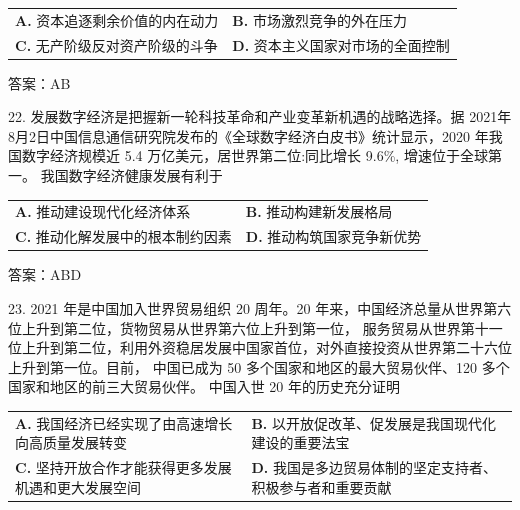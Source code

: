 \documentclass[UTF8,11pt]{ctexart}
\begin{document}
\begin{center}\begin{tabular}{>{\raggedright\arraybackslash}p{\dimexpr(\linewidth-4\tabcolsep)/2\relax}>{\raggedright\arraybackslash}p{\dimexpr(\linewidth-4\tabcolsep)/2\relax}}
\textbf{A.} 资本追逐剩余价值的内在动力 & \textbf{B.} 市场激烈竞争的外在压力\\[.35em]
\textbf{C.} 无产阶级反对资产阶级的斗争 & \textbf{D.} 资本主义国家对市场的全面控制\\[.35em]\end{tabular}\end{center}

答案：AB


22. 发展数字经济是把握新一轮科技革命和产业变革新机遇的战略选择。据 2021年8月2日中国信息通信研究院发布的《全球数字经济白皮书》统计显示，2020 年我国数字经济规模近 5.4 万亿美元，居世界第二位:同比增长 9.6\%, 增速位于全球第一。 我国数字经济健康发展有利于


\begin{center}\begin{tabular}{>{\raggedright\arraybackslash}p{\dimexpr(\linewidth-4\tabcolsep)/2\relax}>{\raggedright\arraybackslash}p{\dimexpr(\linewidth-4\tabcolsep)/2\relax}}
\textbf{A.} 推动建设现代化经济体系 & \textbf{B.} 推动构建新发展格局\\[.35em]
\textbf{C.} 推动化解发展中的根本制约因素 & \textbf{D.} 推动构筑国家竞争新优势\\[.35em]\end{tabular}\end{center}

答案：ABD


23. 2021 年是中国加入世界贸易组织 20 周年。20 年来，中国经济总量从世界第六位上升到第二位，货物贸易从世界第六位上升到第一位， 服务贸易从世界第十一位上升到第二位，利用外资稳居发展中国家首位，对外直接投资从世界第二十六位上升到第一位。目前， 中国已成为 50 多个国家和地区的最大贸易伙伴、120 多个国家和地区的前三大贸易伙伴。 中国入世 20 年的历史充分证明


\begin{center}\begin{tabular}{>{\raggedright\arraybackslash}p{\dimexpr(\linewidth-4\tabcolsep)/2\relax}>{\raggedright\arraybackslash}p{\dimexpr(\linewidth-4\tabcolsep)/2\relax}}
\textbf{A.} 我国经济已经实现了由高速增长向高质量发展转变 & \textbf{B.} 以开放促改革、促发展是我国现代化建设的重要法宝\\[.35em]
\textbf{C.} 坚持开放合作才能获得更多发展机遇和更大发展空间 & \textbf{D.} 我国是多边贸易体制的坚定支持者、积极参与者和重要贡献\\[.35em]\end{tabular}\end{center}
\end{document}
